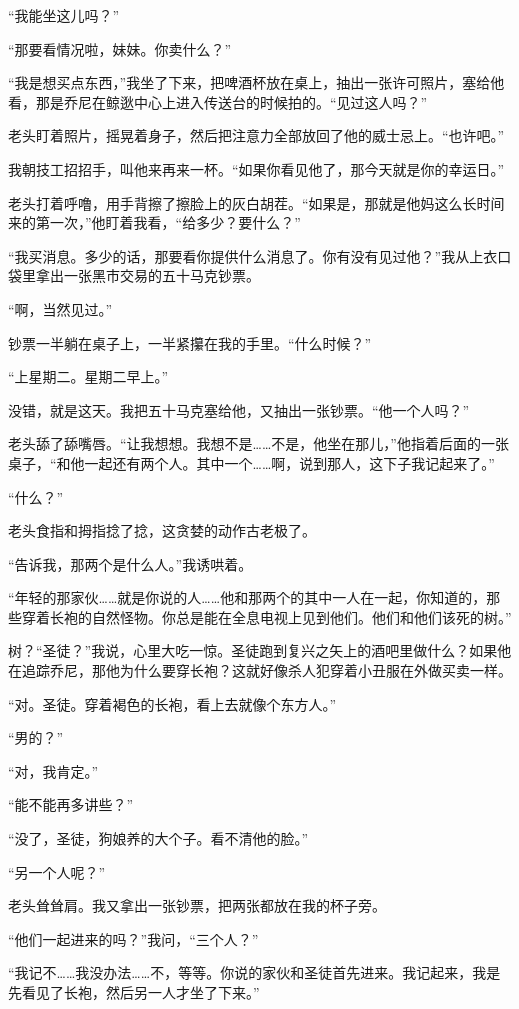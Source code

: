 \documentclass[AutoFakeBold=true]{book}
\begin{document}
``我能坐这儿吗？''

``那要看情况啦，妹妹。你卖什么？''

``我是想买点东西，''我坐了下来，把啤酒杯放在桌上，抽出一张许可照片，塞给他看，那是乔尼在鲸逖中心上进入传送台的时候拍的。``见过这人吗？''

老头盯着照片，摇晃着身子，然后把注意力全部放回了他的威士忌上。``也许吧。''

我朝技工招招手，叫他来再来一杯。``如果你看见他了，那今天就是你的幸运日。''

老头打着呼噜，用手背擦了擦脸上的灰白胡茬。``如果是，那就是他妈这么长时间来的第一次，''他盯着我看，``给多少？要什么？''

``我买消息。多少的话，那要看你提供什么消息了。你有没有见过他？''我从上衣口袋里拿出一张黑市交易的五十马克钞票。

``啊，当然见过。''

钞票一半躺在桌子上，一半紧攥在我的手里。``什么时候？''

``上星期二。星期二早上。''

没错，就是这天。我把五十马克塞给他，又抽出一张钞票。``他一个人吗？''

老头舔了舔嘴唇。``让我想想。我想不是……不是，他坐在那儿，''他指着后面的一张桌子，``和他一起还有两个人。其中一个……啊，说到那人，这下子我记起来了。''

``什么？''

老头食指和拇指捻了捻，这贪婪的动作古老极了。

``告诉我，那两个是什么人。''我诱哄着。

``年轻的那家伙……就是你说的人……他和那两个的其中一人在一起，你知道的，那些穿着长袍的自然怪物。你总是能在全息电视上见到他们。他们和他们该死的树。''

{\kaishu 树}？``圣徒？''我说，心里大吃一惊。圣徒跑到复兴之矢上的酒吧里做什么？如果他在追踪乔尼，那他为什么要穿长袍？这就好像杀人犯穿着小丑服在外做买卖一样。

``对。圣徒。穿着褐色的长袍，看上去就像个东方人。''

``男的？''

``对，我肯定。''

``能不能再多讲些？''

``没了，圣徒，狗娘养的大个子。看不清他的脸。''

``另一个人呢？''

老头耸耸肩。我又拿出一张钞票，把两张都放在我的杯子旁。

``他们一起进来的吗？''我问，``三个人？''

``我记不……我没办法……不，等等。你说的家伙和圣徒首先进来。我记起来，我是先看见了长袍，然后另一人才坐了下来。''
\end{document}
